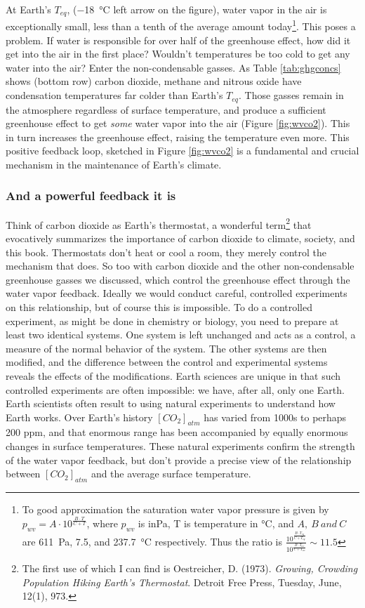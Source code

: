 \documentclass[amstex,12pt]{book}
\begin{document}
At Earth's $T_{eq}$, (\SI{-18}{\celsius} left arrow on the figure), water vapor in the air is exceptionally small, less than a tenth of the average amount today\footnote{To good approximation the saturation water vapor pressure is given by $p_{wv}=A \cdot 10^{\frac{B \cdot T}{C+T}}$, where $p_{wv}$ is in\si{\pascal}, T is temperature in \si{\celsius}, and $A,\ B \ and \ C$ are \SI{611}{\pascal}, 7.5, and \SI{237.7}{\celsius} respectively. Thus the ratio is $\frac{10^{\frac{B \cdot T_{eq}}{C+T_{eq}}}}{10^{\frac{B \cdot T_{av}}{C+T_{av}}}}\sim 11.5$}. This poses a problem. If water is responsible for over half of the greenhouse effect, how did it get into the air in the first place? Wouldn't temperatures be too cold to get any water into the air? Enter the non-condensable gasses. As Table \ref{tab:ghgconcs} shows (bottom row) carbon dioxide, methane and nitrous oxide have condensation temperatures far colder than Earth's $T_{eq}$. Those gasses remain in the atmosphere regardless of surface temperature, and produce a sufficient greenhouse effect to get \emph{some} water vapor into the air (Figure \ref{fig:wvco2}). This in turn increases the greenhouse effect, raising the temperature even more. This positive feedback loop, sketched in Figure \ref{fig:wvco2} is a fundamental and crucial mechanism in the maintenance of Earth's climate.

\subsubsection{And a powerful feedback it is}
Think of carbon dioxide as Earth's thermostat, a wonderful term\footnote{The first use of which I can find is Oestreicher, D. (1973). \textit{Growing, Crowding Population Hiking Earth's Thermostat}. Detroit Free Press, Tuesday, June, 12(1), 973.} that evocatively summarizes the importance of carbon dioxide to climate, society, and this book. Thermostats don't heat or cool a room, they merely control the mechanism that does. So too with carbon dioxide and the other non-condensable greenhouse gasses we discussed, which control the greenhouse effect through the water vapor feedback.
Ideally we would conduct careful, controlled experiments on this relationship, but of course this is impossible. To do a controlled experiment, as might be done in chemistry or biology, you need to prepare at least two identical systems. One system is left unchanged and acts as a control, a measure of the normal behavior of the system. The other systems are then modified, and the difference between the control and experimental systems reveals the effects of the modifications. Earth sciences are unique in that such controlled experiments are often impossible: we have, after all, only one Earth. Earth scientists often result to using natural experiments to understand how Earth works. Over Earth’s history $[CO_2]_{atm}$ has varied from 1000s to perhaps 200 ppm, and that enormous range has been accompanied by equally enormous changes in surface temperatures. These natural experiments confirm the strength of the water vapor feedback, but don't provide a precise view of the relationship between $[CO_2]_{atm}$ and the average surface temperature.\\
\end{document}
